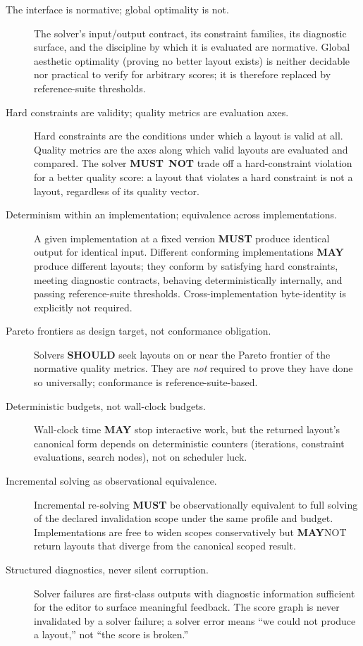 \documentclass[11pt,letterpaper]{report}
\newcommand{\MUST}{\textbf{MUST}}
\newcommand{\MUSTNOT}{\textbf{MUST}\nobreak\ \textbf{NOT}}
\newcommand{\SHOULD}{\textbf{SHOULD}}
\newcommand{\MAY}{\textbf{MAY}}
\begin{document}
\begin{description}
  \item[The interface is normative; global optimality is not.] The
    solver's input/output contract, its constraint families, its
    diagnostic surface, and the discipline by which it is evaluated
    are normative. Global aesthetic optimality (proving no better
    layout exists) is neither decidable nor practical to verify for
    arbitrary scores; it is therefore replaced by reference-suite
    thresholds.
  \item[Hard constraints are validity; quality metrics are evaluation
    axes.] Hard constraints are the conditions under which a layout
    is valid at all. Quality metrics are the axes along which valid
    layouts are evaluated and compared. The solver \MUSTNOT{}
    trade off a hard-constraint violation for a better quality
    score: a layout that violates a hard constraint is not a layout,
    regardless of its quality vector.
  \item[Determinism within an implementation; equivalence across
    implementations.] A given implementation at a fixed version
    \MUST{} produce identical output for identical input. Different
    conforming implementations \MAY{} produce different layouts;
    they conform by satisfying hard constraints, meeting diagnostic
    contracts, behaving deterministically internally, and passing
    reference-suite thresholds. Cross-implementation byte-identity
    is explicitly not required.
  \item[Pareto frontiers as design target, not conformance
    obligation.] Solvers \SHOULD{} seek layouts on or near the
    Pareto frontier of the normative quality metrics. They are
    \emph{not} required to prove they have done so universally;
    conformance is reference-suite-based.
  \item[Deterministic budgets, not wall-clock budgets.] Wall-clock
    time \MAY{} stop interactive work, but the returned layout's
    canonical form depends on deterministic counters
    (iterations, constraint evaluations, search nodes), not on
    scheduler luck.
  \item[Incremental solving as observational equivalence.]
    Incremental re-solving \MUST{} be observationally equivalent
    to full solving of the declared invalidation scope under the
    same profile and budget. Implementations are free to widen
    scopes conservatively but \MAY NOT{} return layouts that
    diverge from the canonical scoped result.
  \item[Structured diagnostics, never silent corruption.] Solver
    failures are first-class outputs with diagnostic information
    sufficient for the editor to surface meaningful feedback. The
    score graph is never invalidated by a solver failure; a solver
    error means ``we could not produce a layout,'' not ``the
    score is broken.''
\end{description}
\end{document}
